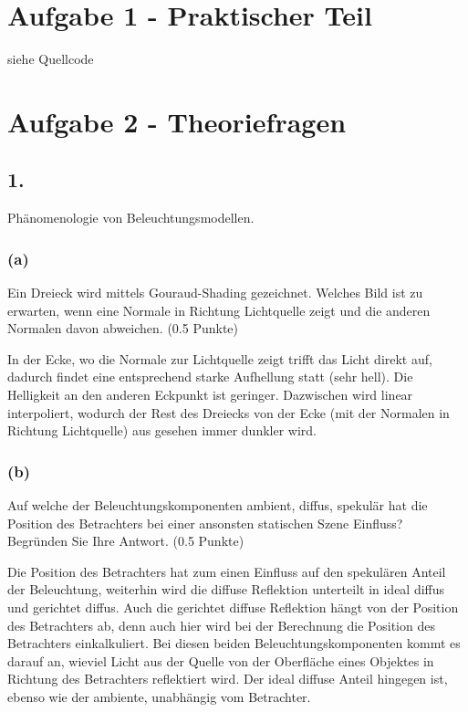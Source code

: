 \documentclass[12pt]{scrreprt}
\begin{document}


\chapter*{Aufgabe 1 - Praktischer Teil}

siehe Quellcode

\chapter*{Aufgabe 2 - Theoriefragen}
\section*{1.}
Phänomenologie von Beleuchtungsmodellen.
\subsection*{(a)}
Ein Dreieck wird mittels Gouraud-Shading gezeichnet. Welches Bild ist zu erwarten, wenn eine Normale in Richtung Lichtquelle zeigt und die anderen Normalen davon abweichen. (0.5 Punkte)

In der Ecke, wo die Normale zur Lichtquelle zeigt trifft das Licht direkt auf, dadurch findet eine entsprechend starke Aufhellung statt (sehr hell). Die Helligkeit an den anderen Eckpunkt ist geringer. Dazwischen wird linear interpoliert, wodurch der Rest des Dreiecks von der Ecke (mit der Normalen in Richtung Lichtquelle) aus gesehen immer dunkler wird.

\subsection*{(b)}
Auf welche der Beleuchtungskomponenten ambient, diffus, spekulär hat die Position des Betrachters bei einer ansonsten statischen Szene Einfluss? Begründen Sie Ihre Antwort. (0.5 Punkte)

Die Position des Betrachters hat zum einen Einfluss auf den spekulären Anteil der Beleuchtung, weiterhin wird die diffuse Reflektion unterteilt in ideal diffus und gerichtet diffus. Auch die gerichtet diffuse Reflektion hängt von der Position des Betrachters ab, denn auch hier wird bei der Berechnung die Position des Betrachters einkalkuliert. Bei diesen beiden Beleuchtungskomponenten kommt es darauf an, wieviel Licht aus der Quelle von der Oberfläche eines Objektes in Richtung des Betrachters reflektiert wird.
Der ideal diffuse Anteil hingegen ist, ebenso wie der ambiente, unabhängig vom Betrachter.
\end{document}
